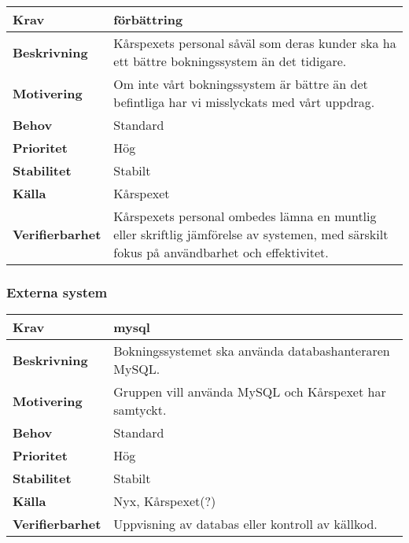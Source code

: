 \documentclass[a4paper, twoside, 11pt, titlepage]{article}
\begin{document}
		\begin{tabular} { | p{3cm} | p{12.2cm} | }
			\hline
			\textbf{Krav} & förbättring  \\
			\hline
			\textbf{Beskrivning} & Kårspexets personal såväl som deras kunder ska ha ett bättre bokningssystem än det tidigare.  \\
			\hline
			\textbf{Motivering} & Om inte vårt bokningssystem är bättre än det befintliga har vi misslyckats med vårt uppdrag.  \\
			\hline
			\textbf{Behov} & Standard  \\
			\hline
			\textbf{Prioritet} & Hög  \\
			\hline
			\textbf{Stabilitet} & Stabilt  \\
			\hline
			\textbf{Källa} & Kårspexet  \\
			\hline
			\textbf{Verifierbarhet} & Kårspexets personal ombedes lämna en muntlig eller skriftlig jämförelse av systemen, med särskilt fokus på användbarhet och effektivitet.  \\
			\hline
		\end{tabular}


	\subsubsection{Externa system}


		\begin{tabular} { | p{3cm} | p{12.2cm} | }
			\hline
			\textbf{Krav} & mysql  \\
			\hline
			\textbf{Beskrivning} & Bokningssystemet ska använda databashanteraren MySQL.  \\
			\hline
			\textbf{Motivering} & Gruppen vill använda MySQL och Kårspexet har samtyckt.  \\
			\hline
			\textbf{Behov} & Standard  \\
			\hline
			\textbf{Prioritet} & Hög  \\
			\hline
			\textbf{Stabilitet} & Stabilt  \\
			\hline
			\textbf{Källa} & Nyx, Kårspexet(?)  \\
			\hline
			\textbf{Verifierbarhet} & Uppvisning av databas eller kontroll av källkod.  \\
			\hline
		\end{tabular}
\end{document}
